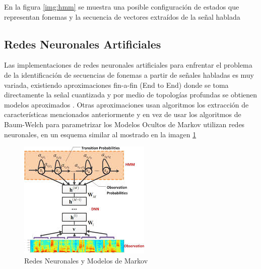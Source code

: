 En la figura \ref{img:hmm} se muestra una posible configuración de estados que representan fonemas y la secuencia de vectores extraídos de la señal hablada

\subsection{Redes Neuronales Artificiales}

Las implementaciones de redes neuronales artificiales para enfrentar el problema de la identificación de secuencias de fonemas a partir de señales habladas es muy variada, existiendo aproximaciones fin-a-fin (End to End) donde se toma directamente la señal cuantizada y por medio de topologías profundas se obtienen modelos aproximados \cite{Hannun2014}. Otras aproximaciones usan algoritmos los extracción de características mencionados anteriormente y en vez de usar los algoritmos de Baum-Welch  para parametrizar los Modelos Ocultos de Markov utilizan redes neuronales, en un esquema similar al mostrado en la imagen \ref{img:cd-dnn-hmm}

\begin{figure}[H]

\centering
\caption{Redes Neuronales y Modelos de Markov \cite{Deng2012}}
\label{img:cd-dnn-hmm}
\includegraphics[]{images/cd-dnn-hmm.jpeg}
\end{figure}


